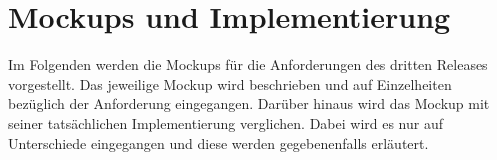 \chapter{Mockups und Implementierung}\label{ch:mockups-und-implementierung}
Im Folgenden werden die Mockups für die Anforderungen des dritten Releases vorgestellt.
Das jeweilige Mockup wird beschrieben und auf Einzelheiten bezüglich der Anforderung eingegangen.
Darüber hinaus wird das Mockup mit seiner tatsächlichen Implementierung verglichen. Dabei wird es nur auf Unterschiede eingegangen und diese werden gegebenenfalls erläutert.










